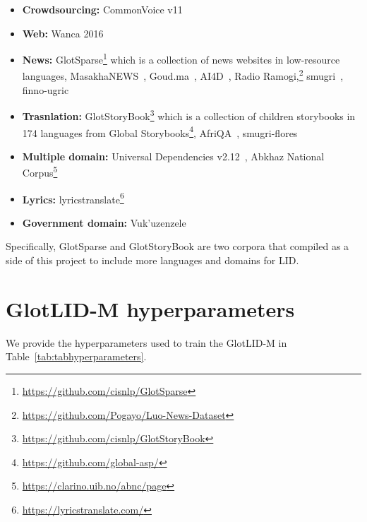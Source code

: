 \documentclass[11pt]{article}
\makeatletter
\newcommand\footnoteref[1]{\protected@xdef\@thefnmark{\ref{#1}}\@footnotemark}
\def\modelname{\mbox{GlotLID-M}\xspace}
\def\tabref#1{Table~\ref{tab:#1}}
\def\seclabel#1{\label{sec:#1}\label{p:#1}}
\makeatother
\begin{document}
\begin{itemize}[noitemsep]
    \item \textbf{Crowdsourcing:}
    CommonVoice v11~\citep{ardila-etal-2020-common}
    \item \textbf{Web:} Wanca 2016~\cite{jauhiainen2019wanca}
    \item \textbf{News:} GlotSparse\footnote{\label{GlotSparse}\url{https://github.com/cisnlp/GlotSparse}} which is a collection of news websites in low-resource languages, MasakhaNEWS~\citep{Adelani2023MasakhaNEWS}, Goud.ma~\citep{issam2022goudma}, AI4D~\citet{siminyu2021ai4d}, Radio Ramogi,\footnote{\url{https://github.com/Pogayo/Luo-News-Dataset}} smugri~\citep{yankovskaya-etal-2023-machine}, finno-ugric~\citep{yankovskaya-etal-2023-machine}
    \item \textbf{Trasnlation:} GlotStoryBook\footnote{\label{GlotStoryBook}\url{https://github.com/cisnlp/GlotStoryBook}} which is a collection of children storybooks in 174 languages from Global Storybooks\footnote{\url{https://github.com/global-asp/}}, AfriQA~\citet{ogundepo2023afriqa}, smugri-flores~\citep{yankovskaya-etal-2023-machine}
    \item \textbf{Multiple domain:} Universal Dependencies v2.12~\citep{nivre-etal-2020-universal}, Abkhaz National Corpus\footnote{\url{https://clarino.uib.no/abnc/page}}
    \item \textbf{Lyrics:} lyricstranslate\footnote{\url{https://lyricstranslate.com/}}
    \item \textbf{Government domain:} Vuk'uzenzele~\citep{lastrucci-etal-2023-preparing}
\end{itemize}

Specifically, GlotSparse\footnoteref{GlotSparse} and GlotStoryBook\footnoteref{GlotStoryBook} are two corpora that compiled as a side of this project to include more languages and domains for LID.

\section{\modelname hyperparameters}\seclabel{hyperparameters}


We provide the hyperparameters used to train the \modelname in \tabref{tabhyperparameters}.
\end{document}
